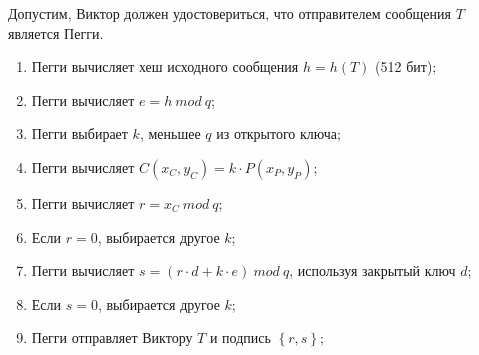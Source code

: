 Допустим, Виктор должен удостовериться, что отправителем сообщения $T$ является Пегги.

\begin{enumerate}

\item Пегги вычисляет хеш исходного сообщения $h = h(T)$ (512 бит);
\item Пегги вычисляет $e = h \ mod \ q$;
\item Пегги выбирает $k$, меньшее $q$ из открытого ключа;
\item Пегги вычисляет $C(x_C, y_C) = k \cdot P(x_P, y_P)$;
\item Пегги вычисляет $r = x_C \ mod \ q$;
\item Если $r = 0$, выбирается другое $k$;
\item Пегги вычисляет $s = (r \cdot d + k \cdot e) \ mod \ q$, используя закрытый ключ $d$;
\item Если $s = 0$, выбирается другое $k$;
\item Пегги отправляет Виктору $T$ и подпись $\left\{r, s \right\}$;

\end{enumerate}
